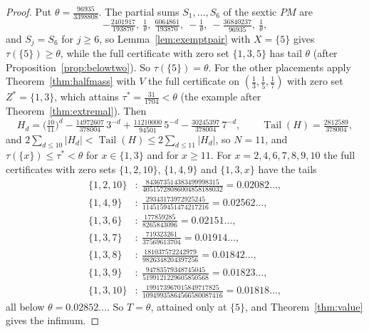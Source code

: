 \documentclass[11pt]{article}
\theoremstyle{definition}
\theoremstyle{plain}
\DeclareMathOperator{\Tail}{Tail}
\begin{document}
\begin{proof}
Put $\theta=\tfrac{96935}{3398808}$.  The partial sums $S_1,\ldots,S_6$ of
the sextic $PM$ are
\[
  -\tfrac{2401917}{193870},\ \tfrac1\theta,\ \tfrac{6064861}{193870},\
  -\tfrac1\theta,\ -\tfrac{36840237}{96935},\ \tfrac1\theta,
\]
and $S_j=S_6$ for $j\ge6$, so Lemma~\ref{lem:exemptpair} with $X=\{5\}$ gives
$\tau(\{5\})\ge\theta$, while the full certificate with zero set
$\{1,3,5\}$ has tail $\theta$ (after Proposition~\ref{prop:belowtwo}).  So
$\tau(\{5\})=\theta$.  For the other placements apply
Theorem~\ref{thm:halfmass} with $V$ the full certificate on
$(\tfrac13,\tfrac15,\tfrac17)$ with zero set $Z^*=\{1,3\}$, which attains
$\tau^*=\tfrac{31}{1704}<\theta$ (the example after
Theorem~\ref{thm:extremal}).  Then
\[
  H_d=\bigl(\tfrac{10}{11}\bigr)^d-\tfrac{14972607}{378004}\,3^{-d}
  +\tfrac{11210000}{94501}\,5^{-d}-\tfrac{30245397}{378004}\,7^{-d},
  \qquad \Tail(H)=\tfrac{2812589}{378004},
\]
and $2\sum_{d\le10}|H_d|<\Tail(H)\le2\sum_{d\le11}|H_d|$, so $N=11$, and
$\tau(\{x\})\le\tau^*<\theta$ for $x\in\{1,3\}$ and for $x\ge11$.  For
$x=2,4,6,7,8,9,10$ the full certificates with zero sets $\{1,2,10\}$,
$\{1,4,9\}$ and $\{1,3,x\}$ have the tails
\begin{align*}
  \{1,2,10\}&:\ \tfrac{843673514383499998315}{40515728086004858188032}=0.02082\ldots,\\
  \{1,4,9\}&:\ \tfrac{29343173972925245}{1145159451474217216}=0.02562\ldots,\\
  \{1,3,6\}&:\ \tfrac{177859285}{8265843096}=0.02151\ldots,\\
  \{1,3,7\}&:\ \tfrac{719323261}{37569613704}=0.01914\ldots,\\
  \{1,3,8\}&:\ \tfrac{181037572242979}{9826348204397256}=0.01842\ldots,\\
  \{1,3,9\}&:\ \tfrac{94783579348745045}{5199121229605850568}=0.01823\ldots,\\
  \{1,3,10\}&:\ \tfrac{199173967015849717825}{10949935864566580087416}=0.01818\ldots,
\end{align*}
all below $\theta=0.02852\ldots$.  So $T=\theta$, attained
only at $\{5\}$, and Theorem~\ref{thm:value} gives the infimum.


\end{proof}
\end{document}
